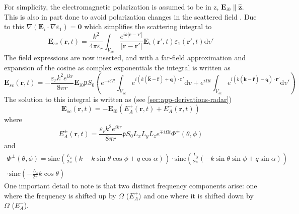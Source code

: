 \documentclass[10pt,a4paper]{eitExjobb}
\begin{document}
	For simplicity, the electromagnetic polarization is assumed to be in z, $\bm{E}_{i0} \parallel \bm{\hat{z}}$. This is also in part done to avoid polarization changes in the scattered field \cite{Korpel1988}. Due to this $\nabla(\bm{E}_i \cdot \nabla \varepsilon_1) = \bm{0}$ which simplifies the scattering integral to
	\begin{equation*}
	\bm{E}_{sc}(\bm{r},t) = \frac{k^2}{4\pi\varepsilon_r} \int_{V_{sc}} \frac{e^{ik |\bm{r}-\bm{r'}| }}{ |\bm{r}-\bm{r'}|} \bm{E}_i (\bm{r'},t) \varepsilon_1 (\bm{r'},t) \mathrm{d}v'
	\end{equation*}
	The field expressions are now inserted, and with a far-field approximation and expansion of the cosine as complex exponentials the integral is written as
	\begin{equation*}
	\bm{E}_{sc}(\bm{r},t) = -\frac{\varepsilon_rk^2 e^{ikr}}{8\pi r} \bm{E}_{i0} \mathfrak{p} S_0 \left( e^{-i\Omega t} \int_{V_{sc}} e^{i( k(\bm{\hat{k}} - \bm{\hat{r}}) + \bm{q} ) \cdot \bm{r}'} \mathrm{d}v + e^{i\Omega t} \int_{V_{sc}} e^{i( k(\bm{\hat{k}} - \bm{\hat{r}}) - \bm{q} ) \cdot \bm{r}'} \mathrm{d}v' \right)
	\end{equation*}
	The solution to this integral is written as (see \ref{sec:app-derivations-radar})
	\begin{equation*}
	\bm{E}_{sc} (\bm{r},t) = -\bm{E}_{i0} \left( E_A^+ (\bm{r},t) + E_A^- (\bm{r},t) \right)
	\end{equation*}
	where
	\begin{equation*}
	E_A^\pm (\bm{r},t) = \frac{\varepsilon_rk^2 e^{ikr}}{8\pi r} \mathfrak{p} S_0 L_x L_y L_z e^{\mp i\Omega t} \Phi^\pm (\theta,\phi)
	\end{equation*}
	and
	\begin{multline*}
	\Phi^\pm(\theta,\phi) = \text{sinc} \left( \frac{L_x}{2\pi} \left( k - k\sin{\theta}\cos{\phi} \pm q\cos{\alpha} \right) \right) 
	\cdot \text{sinc} \left( \frac{L_y}{2\pi} \left( -k\sin{\theta}\sin{\phi} \pm q\sin{\alpha} \right) \right) \\
	\cdot \text{sinc} \left( -\frac{L_z}{2\pi} k\cos{\theta} \right)
	\end{multline*}
	One important detail to note is that two distinct frequency components arise: one where the frequency is shifted up by $\Omega$ ($E_A^+$) and one where it is shifted down by $\Omega$ ($E_A^-$).
	
\end{document}
